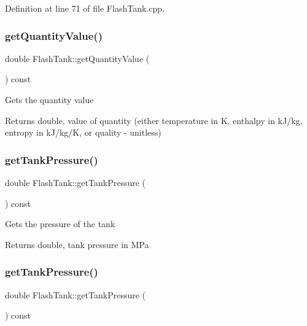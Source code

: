 Definition at line 71 of file Flash\+Tank.\+cpp.

\mbox{\label{class_flash_tank_ab2145598969881df58736a1b65326d17}} 
\subsubsection{\texorpdfstring{get\+Quantity\+Value()}{getQuantityValue()}\hspace{0.1cm}{\footnotesize\ttfamily [3/3]}}
{\footnotesize\ttfamily double Flash\+Tank\+::get\+Quantity\+Value (\begin{DoxyParamCaption}{ }\end{DoxyParamCaption}) const}

Gets the quantity value \begin{DoxyReturn}{Returns}
double, value of quantity (either temperature in K, enthalpy in k\+J/kg, entropy in k\+J/kg/K, or quality -\/ unitless) 
\end{DoxyReturn}
\mbox{\label{class_flash_tank_af5d4f0bf7babe61120e1e4452594e1af}} 
\subsubsection{\texorpdfstring{get\+Tank\+Pressure()}{getTankPressure()}\hspace{0.1cm}{\footnotesize\ttfamily [1/3]}}
{\footnotesize\ttfamily double Flash\+Tank\+::get\+Tank\+Pressure (\begin{DoxyParamCaption}{ }\end{DoxyParamCaption}) const}

Gets the pressure of the tank \begin{DoxyReturn}{Returns}
double, tank pressure in M\+Pa 
\end{DoxyReturn}
\mbox{\label{class_flash_tank_af5d4f0bf7babe61120e1e4452594e1af}} 
\subsubsection{\texorpdfstring{get\+Tank\+Pressure()}{getTankPressure()}\hspace{0.1cm}{\footnotesize\ttfamily [2/3]}}
{\footnotesize\ttfamily double Flash\+Tank\+::get\+Tank\+Pressure (\begin{DoxyParamCaption}{ }\end{DoxyParamCaption}) const}

